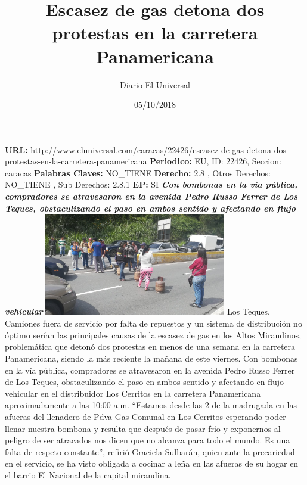 \documentclass{article}%
\title{\textbf{Escasez de gas detona dos protestas en la carretera Panamericana}}%
\author{Diario El Universal}%
\date{05/10/2018}%
\begin{document}
%
\normalsize%
\maketitle%
\textbf{URL: }%
http://www.eluniversal.com/caracas/22426/escasez{-}de{-}gas{-}detona{-}dos{-}protestas{-}en{-}la{-}carretera{-}panamericana\newline%
%
\textbf{Periodico: }%
EU, %
ID: %
22426, %
Seccion: %
caracas\newline%
%
\textbf{Palabras Claves: }%
NO\_TIENE\newline%
%
\textbf{Derecho: }%
2.8%
, Otros Derechos: %
NO\_TIENE%
, Sub Derechos: %
2.8.1%
\newline%
%
\textbf{EP: }%
SI\newline%
\newline%
%
\textbf{\textit{Con bombonas en la vía pública, compradores se atravesaron en la avenida Pedro Russo Ferrer de Los Teques, obstaculizando el paso en ambos sentido y afectando en flujo vehicular}}%
\newline%
\newline%
%
\includegraphics[width=300px]{236.jpg}%
\newline%
%
Los Teques.  Camiones fuera de servicio por falta de repuestos y un sistema de distribución no óptimo serían las principales causas de la escasez de gas en los Altos Mirandinos, problemática que detonó dos protestas en menos de una semana en la carretera Panamericana, siendo la más reciente la mañana de este viernes.%
\newline%
%
Con bombonas en la vía pública, compradores se atravesaron en la avenida Pedro Russo Ferrer de Los Teques, obstaculizando el paso en ambos sentido y afectando en flujo vehicular en el distribuidor Los Cerritos en la carretera Panamericana aproximadamente a las 10:00 a.m.%
\newline%
%
“Estamos desde las 2 de la madrugada en las afueras del llenadero de Pdva Gas Comunal en Los Cerritos  esperando poder llenar nuestra bombona y resulta que después de pasar frío y exponernos al peligro de ser atracados nos dicen que no alcanza para todo el mundo. Es una falta de respeto constante”, refirió Graciela Sulbarán, quien ante la precariedad en el servicio, se ha visto obligada a cocinar a leña en las afueras de su hogar en el barrio El Nacional de la capital mirandina.%
\end{document}
